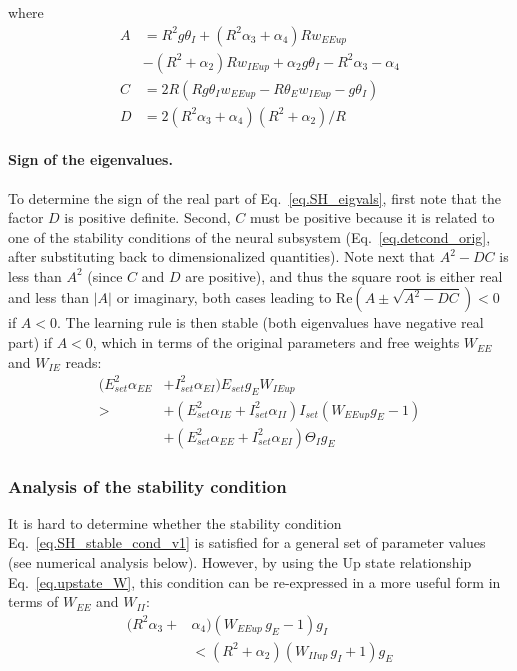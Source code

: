 \documentclass[twocolumn]{article}
\newcommand{\EE}{\mathit{EE}}
\newcommand{\EI}{\mathit{EI}}
\newcommand{\IE}{\mathit{IE}}
\newcommand{\II}{\mathit{II}}
\newcommand{\set}{\mathit{set}}
\newcommand{\up}{\mathit{up}}
\newcommand{\RE}{\mathrm{Re}}
\begin{document}
\noindent where
\begin{equation}
\begin{aligned}
A & = R^2 g \theta_I + (R^2 \alpha_3 + \alpha_4) R w_{\EE\up} \\
& - (R^2 + \alpha_2)R w_{\IE\up} + \alpha_2 g \theta_I - R^2 \alpha_3 - \alpha_4 \\
C & = 2R(R g \theta_I w_{\EE\up} - R \theta_E w_{\IE\up} - g \theta_I) \\
D & = 2(R^2\alpha_3 + \alpha_4)(R^2 + \alpha_2)/R
\end{aligned}
\end{equation}


\paragraph{Sign of the eigenvalues.}

To determine the sign of the real part of Eq.\ \ref{eq.SH_eigvals}, first note that the factor $D$ is positive definite. Second, $C$ must be positive because it is related to one of the stability conditions of the neural subsystem (Eq.\ \ref{eq.detcond_orig}, after substituting back to dimensionalized quantities). Note next that $A^2 - DC$ is less than $A^2$ (since $C$ and $D$ are positive), and thus the square root is either real and less than $|A|$ or imaginary, both cases leading to $\RE(A \pm \sqrt{A^2-DC}) < 0$ if $A<0$. The learning rule is then stable (both eigenvalues have negative real part) if $A<0$, which in terms of the original parameters and free weights $W_{\EE}$ and $W_{\IE}$ reads:
\begin{equation}
\begin{aligned}
(E_{\set}^2 \alpha_{\EE} & + I_{\set}^2 \alpha_{\EI}) E_{\set} g_E W_{\IE\up} \\
> & + (E_{\set}^2 \alpha_{\IE} + I_{\set}^2 \alpha_{\II}) I_{\set}(W_{\EE\up} g_E - 1) \\
& + (E_{\set}^2 \alpha_{\EE} + I_{\set}^2 \alpha_{\EI}) \Theta_I g_E
\end{aligned}
\label{eq.SH_stable_cond_v1}
\end{equation}


\subsubsection{Analysis of the stability condition}

It is hard to determine whether the stability condition Eq.\ \ref{eq.SH_stable_cond_v1} is satisfied for a general set of parameter values (see numerical analysis below). However, by using the Up state relationship Eq.\ \ref{eq.upstate_W}, this condition can be re-expressed in a more useful form in terms of $W_{\EE}$ and $W_{\II}$:
\begin{equation}
\begin{aligned}
(R^2 \alpha_3 + & \alpha_4)(W_{\EE\up} \, g_E  - 1)g_I \\
& < (R^2 + \alpha_2)(W_{\II\up} \, g_I + 1)g_E
\end{aligned}
\label{eq.SH_stable_cond_v2}
\end{equation}
\end{document}
